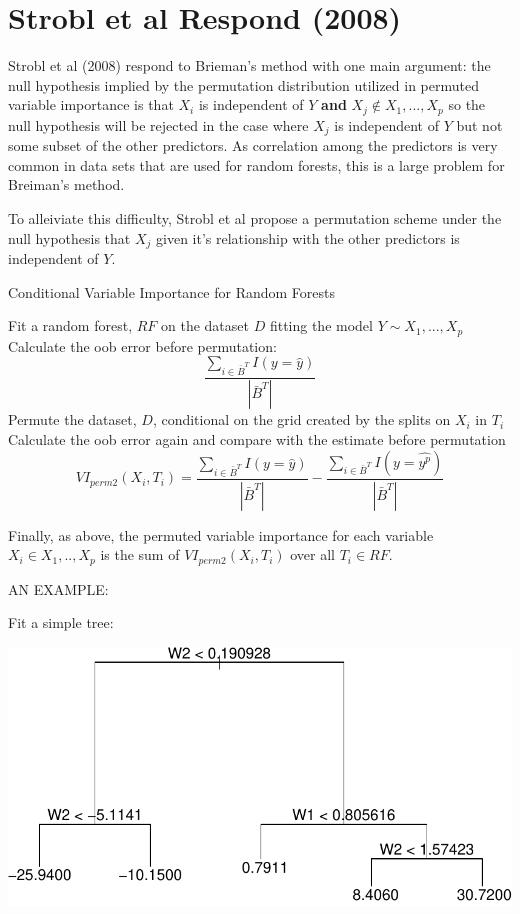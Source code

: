 \documentclass[12pt,twoside]{reedthesis}
\begin{document}
  \section{Strobl et al Respond (2008)}\label{strobl-et-al-respond-2008}
  
  Strobl et al (2008) respond to Brieman's method with one main argument:
  the null hypothesis implied by the permutation distribution utilized in
  permuted variable importance is that \(X_i\) is independent of \(Y\)
  \textbf{and} \({X_j \notin X_1,...,X_p}\) so the null hypothesis will be
  rejected in the case where \(X_j\) is independent of \(Y\) but not some
  subset of the other predictors. As correlation among the predictors is
  very common in data sets that are used for random forests, this is a
  large problem for Breiman's method.
  
  To alleiviate this difficulty, Strobl et al propose a permutation scheme
  under the null hypothesis that \(X_j\) given it's relationship with the
  other predictors is independent of \(Y\).
  
  \begin{algorithm}
  \caption{Conditional Variable Importance for Random Forests}
  \label{strobl}
  \begin{algorithmic}[1]
  \State Fit a random forest, $RF$ on the dataset $D$ fitting the model $Y \sim X_1,...,X_p$
  \State Calculate the oob error before permutation: $$\frac{\sum_{i \in \bar{B}^{T}} I(y = \hat{y})} {|\bar{B}^{T}|}$$
  \State Permute the dataset, $D$, conditional on the grid created by the splits on $X_i$ in $T_i$
  \State Calculate the oob error again and compare with the estimate before permutation $$VI_{perm2}(X_i, T_i) = \frac{\sum_{i \in \bar{B}^{T}} I(y = \hat{y})} {|\bar{B}^{T}|} -\frac{\sum_{i \in \bar{B}^{T}} I(y = \hat{y^p})} {|\bar{B}^{T}|}$$
  \EndFor
  \EndFor
  \end{algorithmic}
  \end{algorithm}
  
  Finally, as above, the permuted variable importance for each variable
  \(X_i \in {{X_1,..,X_p}}\) is the sum of \(VI_{perm2}(X_i, T_i)\) over
  all \(T_i \in RF\).
  
  AN EXAMPLE:
  
  Fit a simple tree:
  
  \begin{center}\includegraphics{Thesis_files/figure-latex/unnamed-chunk-2-1} \end{center}
  
\end{document}
